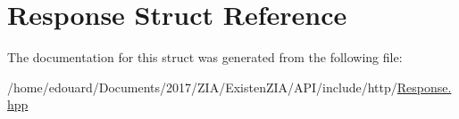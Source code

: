 \hypertarget{structResponse}{}\section{Response Struct Reference}
\label{structResponse}


The documentation for this struct was generated from the following file\+:\begin{DoxyCompactItemize}
\item 
/home/edouard/\+Documents/2017/\+Z\+I\+A/\+Existen\+Z\+I\+A/\+A\+P\+I/include/http/\mbox{\hyperlink{Response_8hpp}{Response.\+hpp}}\end{DoxyCompactItemize}
